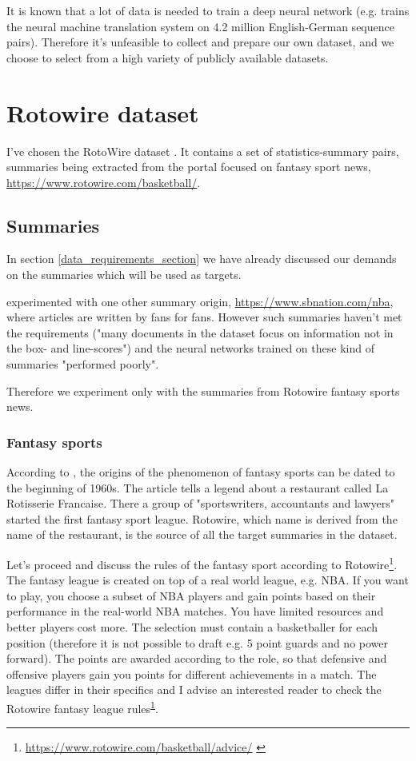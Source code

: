 It is known that a lot of data is needed to train a deep neural network (e.g. \citep{sennrich2016} trains the neural machine translation system on 4.2 million English-German sequence pairs). Therefore it's unfeasible to collect and prepare our own dataset, and we choose to select from a high variety of publicly available datasets.

\section{Rotowire dataset}

I've chosen the RotoWire dataset \citep{wiseman2017}. It contains a set of statistics-summary pairs, summaries being extracted from the portal focused on fantasy sport news, \url{https://www.rotowire.com/basketball/}.

\subsection{Summaries}

In section \ref{data_requirements_section} we have already discussed our demands on the summaries which will be used as targets.

\citep{wiseman2017} experimented with one other summary origin, \url{https://www.sbnation.com/nba}, where articles are written by fans for fans. However such summaries haven't met the requirements ("many documents in the dataset focus on information not in the box- and line-scores") and the neural networks trained on these kind of summaries "performed poorly".

Therefore we experiment only with the summaries from Rotowire fantasy sports news.

\subsubsection{Fantasy sports}

According to \citep{Tozzi1999}, the origins of the phenomenon of fantasy sports can be dated to the beginning of 1960s. The article tells a legend about a restaurant called La Rotisserie Francaise. There a group of "sportswriters, accountants and lawyers" started the first fantasy sport league. Rotowire, which name is derived from the name of the restaurant, is the source of all the target summaries in the dataset.

Let's proceed and discuss the rules of the fantasy sport according to Rotowire\footnote{\url{https://www.rotowire.com/basketball/advice/} \label{footnote_2_fs}}. The fantasy league is created on top of a real world league, e.g. NBA. If you want to play, you choose a subset of NBA players and gain points based on their performance in the real-world NBA matches. You have limited resources and better players cost more. The selection must contain a basketballer for each position (therefore it is not possible to draft e.g. 5 point guards and no power forward). The points are awarded according to the role, so that defensive and offensive players gain you points for different achievements in a match. The leagues differ in their specifics and I advise an interested reader to check the Rotowire fantasy league rules\textsuperscript{\ref{footnote_2_fs}}.

